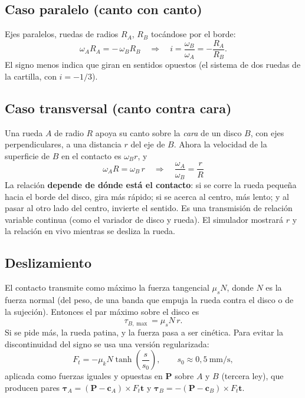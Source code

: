 \documentclass[11pt,a4paper]{article}
\numberwithin{equation}{section}
\newcommand{\vect}[1]{\bm{#1}}
\begin{document}
\subsection{Caso paralelo (canto con canto)}
Ejes paralelos, ruedas de radios $R_A$, $R_B$ tocándose por el borde:
\begin{equation}
  \omega_A R_A = -\,\omega_B R_B \quad\Longrightarrow\quad i = \frac{\omega_B}{\omega_A} = -\frac{R_A}{R_B}.
\end{equation}
El signo menos indica que giran en sentidos opuestos (el sistema de dos ruedas de la cartilla, con $i=-1/3$).

\subsection{Caso transversal (canto contra cara)}
Una rueda $A$ de radio $R$ apoya su canto sobre la \emph{cara} de un disco $B$, con ejes perpendiculares, a una
distancia $r$ del eje de $B$. Ahora la velocidad de la superficie de $B$ en el contacto es $\omega_B r$, y
\begin{equation}
  \boxed{\;\omega_A R = \omega_B\, r \quad\Longrightarrow\quad \frac{\omega_A}{\omega_B} = \frac{r}{R}\;}
\end{equation}
La relación \textbf{depende de dónde está el contacto}: si se corre la rueda pequeña hacia el borde del disco, gira
más rápido; si se acerca al centro, más lento; y al pasar al otro lado del centro, invierte el sentido. Es una
transmisión de relación variable continua (como el variador de disco y rueda). El simulador mostrará $r$ y la
relación en vivo mientras se desliza la rueda.

\subsection{Deslizamiento}
El contacto transmite como máximo la fuerza tangencial $\mu_s N$, donde $N$ es la fuerza normal (del peso, de una
banda que empuja la rueda contra el disco o de la sujeción). Entonces el par máximo sobre el disco es
\begin{equation}
  \tau_{B,\max} = \mu_s N\, r .
\end{equation}
Si se pide más, la rueda patina, y la fuerza pasa a ser cinética. Para evitar la discontinuidad del signo se usa
una versión regularizada:
\begin{equation}
  F_t = -\mu_k N \tanh\!\left(\frac{s}{s_0}\right),\qquad s_0 \approx 0{,}5\ \mathrm{mm/s},
\end{equation}
aplicada como fuerzas iguales y opuestas en $\vect{P}$ sobre $A$ y $B$ (tercera ley), que producen pares
$\vect{\tau}_A = (\vect{P}-\vect{c}_A)\times F_t\vect{t}$ y $\vect{\tau}_B = -(\vect{P}-\vect{c}_B)\times F_t\vect{t}$.
\end{document}
